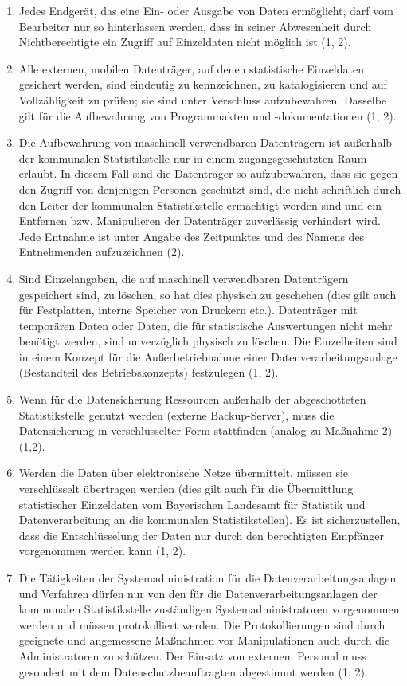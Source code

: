 \begin{enumerate}[label=\arabic*.]
            \item Jedes Endgerät, das eine Ein- oder Ausgabe von Daten ermöglicht, darf vom Bearbeiter nur so hinterlassen werden, dass in seiner Abwesenheit durch Nichtberechtigte ein Zugriff auf Einzeldaten nicht möglich ist (1, 2).
            \item Alle externen, mobilen Datenträger, auf denen statistische Einzeldaten gesichert werden, sind eindeutig zu kennzeichnen, zu katalogisieren und auf Vollzähligkeit zu prüfen; sie sind unter Verschluss aufzubewahren. Dasselbe gilt für die Aufbewahrung von Programmakten und -dokumentationen (1, 2).
            \item Die Aufbewahrung von maschinell verwendbaren Datenträgern ist außerhalb der kommunalen Statistikstelle nur in einem zugangsgeschützten Raum erlaubt. In diesem Fall sind die Datenträger so aufzubewahren, dass sie gegen den Zugriff von denjenigen Personen geschützt sind, die nicht schriftlich durch den Leiter der kommunalen Statistikstelle ermächtigt worden sind und ein Entfernen bzw. Manipulieren der Datenträger zuverlässig verhindert wird. Jede Entnahme ist unter Angabe des Zeitpunktes und des Namens des Entnehmenden aufzuzeichnen (2).
            \item Sind Einzelangaben, die auf maschinell verwendbaren Datenträgern gespeichert sind, zu löschen, so hat dies physisch zu geschehen (dies gilt auch für Festplatten, interne Speicher von Druckern etc.). Datenträger mit temporären Daten oder Daten, die für statistische Auswertungen nicht mehr benötigt werden, sind unverzüglich physisch zu löschen. Die Einzelheiten sind in einem Konzept für die Außerbetriebnahme einer Datenverarbeitungsanlage (Bestandteil des Betriebskonzepts) festzulegen (1, 2).
            \item Wenn für die Datensicherung Ressourcen außerhalb der abgeschotteten Statistikstelle genutzt werden (externe Backup-Server), muss die Datensicherung in verschlüsselter Form stattfinden (analog zu Maßnahme 2) (1,2).
            \item Werden die Daten über elektronische Netze übermittelt, müssen sie verschlüsselt übertragen werden (dies gilt auch für die Übermittlung statistischer Einzeldaten vom Bayerischen Landesamt für Statistik und Datenverarbeitung an die kommunalen Statistikstellen). Es ist sicherzustellen, dass die Entschlüsselung der Daten nur durch den berechtigten Empfänger vorgenommen werden kann (1, 2).
            \item Die Tätigkeiten der Systemadministration für die Datenverarbeitungsanlagen und Verfahren dürfen nur von den für die Datenverarbeitungsanlagen der kommunalen Statistikstelle zuständigen Systemadministratoren vorgenommen werden und müssen protokolliert werden. Die Protokollierungen sind durch geeignete und angemessene Maßnahmen vor Manipulationen auch durch die Administratoren zu schützen. Der Einsatz von externem Personal muss gesondert mit dem Datenschutzbeauftragten abgestimmt werden (1, 2).

\end{enumerate}
